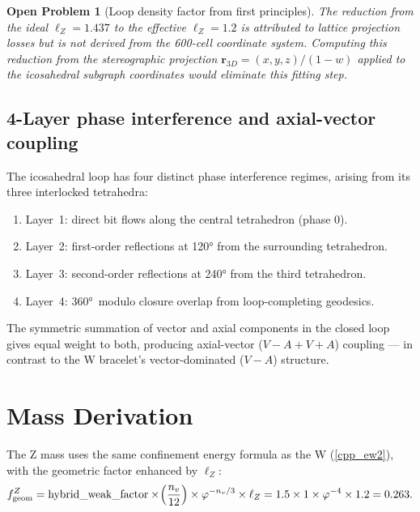 \documentclass[11pt,letterpaper]{article}
\newtheorem{openprob}[theorem]{Open Problem}
\newcommand{\phig}{\varphi}
\begin{document}
\begin{openprob}[Loop density factor from first principles]
\label{op:loopfactor}
The reduction from the ideal $\ell_Z = 1.437$ to the effective
$\ell_Z = 1.2$ is attributed to lattice projection losses but is not
derived from the 600-cell coordinate system.  Computing this reduction
from the stereographic projection $\mathbf{r}_{3D} = (x,y,z)/(1-w)$
applied to the icosahedral subgraph coordinates would eliminate this
fitting step.
\end{openprob}

\subsection{4-Layer phase interference and axial-vector coupling}

The icosahedral loop has four distinct phase interference regimes,
arising from its three interlocked tetrahedra:
\begin{enumerate}
\item Layer~1: direct bit flows along the central tetrahedron (phase 0).
\item Layer~2: first-order reflections at 120° from the surrounding tetrahedron.
\item Layer~3: second-order reflections at 240° from the third tetrahedron.
\item Layer~4: 360°~modulo closure overlap from loop-completing geodesics.
\end{enumerate}
The symmetric summation of vector and axial components in the closed
loop gives equal weight to both, producing axial-vector ($V-A+V+A$)
coupling --- in contrast to the W bracelet's vector-dominated ($V-A$)
structure.

\section{Mass Derivation}

The Z mass uses the same confinement energy formula as the W
(\ref{cpp_ew2}), with the geometric factor enhanced by $\ell_Z$:
\begin{equation}
f_{\rm geom}^Z
= \text{hybrid\_weak\_factor}
  \times\!\left(\frac{n_v}{12}\right)
  \times \phig^{-n_v/3}
  \times \ell_Z
= 1.5\times 1\times\phig^{-4}\times 1.2
= 0.263.
\label{eq:fgeom_z}
\end{equation}
\end{document}
